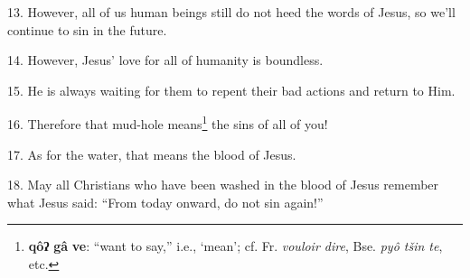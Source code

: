 13. However, all of us human beings still do not heed the words of Jesus, so we'll
continue to sin in the future.

14. However, Jesus' love for all of humanity is boundless.

15. He is always waiting for them to repent their bad actions and return to Him.

16. Therefore that mud-hole means\footnote{\textbf{qôʔ} \textbf{gâ} \textbf{ve}: ``want to say,'' i.e., `mean'; cf. Fr. \textit{vouloir dire}, Bse. \textit{pyô tšin te}, etc.} the sins of all of you!

17. As for the water, that means the blood of Jesus.

18. May all Christians who have been washed in the blood of Jesus remember what
Jesus said: ``From today onward, do not sin again!''

